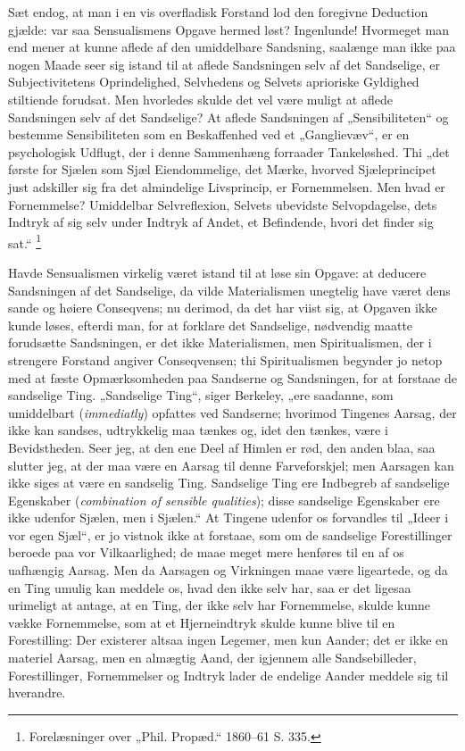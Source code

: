 \documentclass[11pt]{book}
\newcommand{\opage}[1]{\marginnote{\footnotesize\textit{[#1]}}}
\begin{document}
Sæt endog, at man i en vis overfladisk Forstand lod den foregivne
Deduction gjælde: var saa Sensualismens Opgave hermed løst?
Ingenlunde! Hvormeget man end mener at kunne aflede af den umiddelbare
Sandsning, saalænge man
\opage{28} \setcounter{footnote}{0}%
ikke paa nogen Maade seer sig istand til at aflede Sandsningen selv af
det Sandselige, er Subjectivitetens Oprindelighed, Selvhedens og
Selvets aprioriske Gyldighed stiltiende forudsat. Men hvorledes skulde
det vel være muligt at aflede Sandsningen selv af det Sandselige? At
aflede Sandsningen af „Sensibiliteten“ og bestemme Sensibiliteten som
en Beskaffenhed ved et „Ganglievæv“, er en psychologisk Udflugt, der i
denne Sammenhæng forraader Tankeløshed. Thi „det første for Sjælen som
Sjæl Eiendommelige, det Mærke, hvorved Sjæleprincipet just adskiller
sig fra det almindelige Livsprincip, er Fornemmelsen. Men hvad er
Fornemmelse? Umiddelbar Selvreflexion, Selvets ubevidste
Selvopdagelse, dets Indtryk af sig selv under Indtryk af Andet, et
Befindende, hvori det finder sig sat.“%
\footnote{Forelæsninger over „Phil. Propæd.“ 1860--61 S. 335.}

Havde Sensualismen virkelig været istand til at løse sin Opgave: at
deducere Sandsningen af det Sandselige, da vilde Materialismen
unegtelig have været dens sande og høiere Conseqvens; nu derimod, da
det har viist sig, at Opgaven ikke kunde løses, efterdi man, for at
forklare det Sandselige, nødvendig maatte forudsætte Sandsningen, er
det ikke Materialismen, men Spiritualismen, der i strengere Forstand
angiver Conseqvensen; thi Spiritualismen begynder jo netop med at
fæste Opmærksomheden paa Sandserne og Sandsningen, for at forstaae de
sandselige Ting. „Sandselige Ting“, siger Berkeley, „ere saadanne, som
umiddelbart (\textit{immediatly}) opfattes ved Sandserne; hvorimod
Tingenes Aarsag, der ikke kan sandses, udtrykkelig maa tænkes og, idet
den tænkes, være i Bevidstheden. Seer jeg, at den ene Deel af Himlen
er rød, den anden blaa, saa slutter jeg, at der maa være en Aarsag til
denne Farveforskjel; men Aarsagen kan ikke siges at være en sandselig
Ting. Sandselige Ting ere Indbegreb af sandselige Egenskaber
(\textit{combination of sensible qualities});
\opage{29} \setcounter{footnote}{0}%
disse sandselige Egenskaber ere ikke udenfor Sjælen, men i Sjælen.“ At
Tingene udenfor os forvandles til „Ideer i vor egen Sjæl“, er jo
vistnok ikke at forstaae, som om de sandselige Forestillinger beroede
paa vor Vilkaarlighed; de maae meget mere henføres til en af os
uafhængig Aarsag. Men da Aarsagen og Virkningen maae være ligeartede,
og da en Ting umulig kan meddele os, hvad den ikke selv har, saa er
det ligesaa urimeligt at antage, at en Ting, der ikke selv har
Fornemmelse, skulde kunne vække Fornemmelse, som at et Hjerneindtryk
skulde kunne blive til en Forestilling: Der existerer altsaa ingen
Legemer, men kun Aander; det er ikke en materiel Aarsag, men en
almægtig Aand, der igjennem alle Sandsebilleder, Forestillinger,
Fornemmelser og Indtryk lader de endelige Aander meddele sig til
hverandre.
\end{document}
